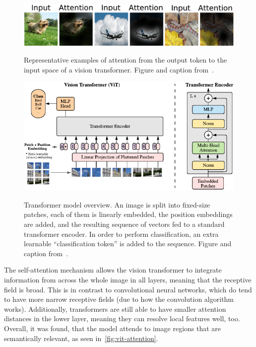 \begin{figure}[htb]
    \centering
    \includegraphics[width=\textwidth]{pictures/vit-attention2}\\
    \caption[Examples of Attention in Vision Transformers]{Representative examples of attention from the output token to the input space of a vision transformer. Figure and caption from~\autocite{Dosovitskiy2021}.}
    \label{fig:vit-attention}
\end{figure}

\begin{figure}[htb]
    \centering
    \includegraphics[width=\textwidth]{pictures/vit}\\
    \caption[Vision Transformer Model Structure]{Transformer model overview. An image is split into fixed-size patches, each of them is linearly embedded, the position embeddings are added, and the resulting sequence of vectors fed to a standard transformer encoder. In order to perform classification, an extra learnable ``classification token'' is added to the sequence. Figure and caption from~\autocite{Dosovitskiy2021}.}
    \label{fig:vit}
\end{figure}



The self-attention mechanism allows the vision transformer to integrate information from across the whole image in all layers, meaning that the receptive field is broad.
This is in contrast to convolutional neural networks, which do tend to have more narrow receptive fields (due to how the convolution algorithm works).
Additionally, transformers are still able to have smaller attention distances in the lower layer, meaning they can resolve local features well, too.
Overall, it was found, that the model attends to image regions that are semantically relevant, as seen in~\autoref{fig:vit-attention}.~\autocite{Dosovitskiy2021}

